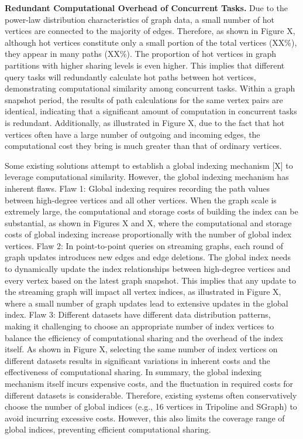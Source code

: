 \documentclass[lettersize,journal]{IEEEtran} %
\begin{document}
{\bf{Redundant Computational Overhead of Concurrent Tasks.}} Due to the power-law distribution characteristics of graph data, a small number of hot vertices are connected to the majority of edges. Therefore, as shown in Figure X, although hot vertices constitute only a small portion of the total vertices (XX\%), they appear in many paths (XX\%). The proportion of hot vertices in graph partitions with higher sharing levels is even higher. This implies that different query tasks will redundantly calculate hot paths between hot vertices, demonstrating computational similarity among concurrent tasks. Within a graph snapshot period, the results of path calculations for the same vertex pairs are identical, indicating that a significant amount of computation in concurrent tasks is redundant. Additionally, as illustrated in Figure X, due to the fact that hot vertices often have a large number of outgoing and incoming edges, the computational cost they bring is much greater than that of ordinary vertices.

Some existing solutions attempt to establish a global indexing mechanism [X] to leverage computational similarity. However, the global indexing mechanism has inherent flaws. Flaw 1: Global indexing requires recording the path values between high-degree vertices and all other vertices. When the graph scale is extremely large, the computational and storage costs of building the index can be substantial, as shown in Figures X and X, where the computational and storage costs of global indexing increase proportionally with the number of global index vertices. Flaw 2: In point-to-point queries on streaming graphs, each round of graph updates introduces new edges and edge deletions. The global index needs to dynamically update the index relationships between high-degree vertices and every vertex based on the latest graph snapshot. This implies that any update to the streaming graph will impact all vertex indices, as illustrated in Figure X, where a small number of graph updates lead to extensive updates in the global index. Flaw 3: Different datasets have different data distribution patterns, making it challenging to choose an appropriate number of index vertices to balance the efficiency of computational sharing and the overhead of the index itself. As shown in Figure X, selecting the same number of index vertices on different datasets results in significant variations in inherent costs and the effectiveness of computational sharing. In summary, the global indexing mechanism itself incurs expensive costs, and the fluctuation in required costs for different datasets is considerable. Therefore, existing systems often conservatively choose the number of global indices (e.g., 16 vertices in Tripoline and SGraph) to avoid incurring excessive costs. However, this also limits the coverage range of global indices, preventing efficient computational sharing.
\end{document}
